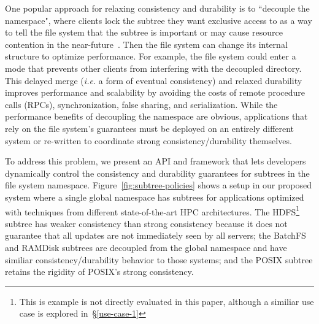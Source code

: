 One popular approach for relaxing consistency and durability is to ``decouple
the namespace", where clients lock the subtree they want exclusive access to as
a way to tell the file system that the subtree is important or may cause
resource contention in the near-future~\cite{grider:pdsw2015-marfs,
zheng:pdsw2015-deltafs, zheng:pdsw2014-batchfs, ren:sc2014-indexfs,
bent:slides-twotiers}. Then the file system can change its internal structure
to optimize performance. For example, the file system could enter a mode that
prevents other clients from interfering with the decoupled directory.  This
delayed merge ({\it i.e.} a form of eventual consistency) and relaxed
durability improves performance and scalability by avoiding the costs of remote
procedure calls (RPCs), synchronization, false sharing, and serialization.
While the performance benefits of decoupling the namespace are obvious,
applications that rely on the file system's guarantees must be deployed on an
entirely different system or re-written to coordinate strong
consistency/durability themselves.

%

To address this problem, we present an API and framework that lets developers
dynamically control the consistency and durability guarantees for subtrees in
the file system namespace.  Figure~\ref{fig:subtree-policies} shows a setup in
our proposed system where a single global namespace has subtrees for
applications optimized with techniques from different state-of-the-art HPC
architectures.  The HDFS\footnote{This is example is not directly evaluated in
this paper, although a similiar use case is explored in~\S\ref{use-case-1}}
subtree has weaker consistency than strong consistency because it  does not
guarantee that all updates are not immediately seen by all servers; the BatchFS
and RAMDisk subtrees are decoupled from the global namespace and have similiar
consistency/durability behavior to those systems; and the POSIX subtree retains
the rigidity of POSIX's strong consistency.

